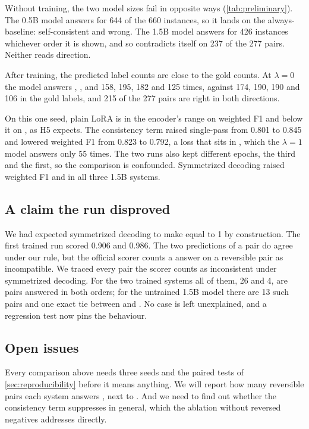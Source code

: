 Without training, the two model sizes fail in opposite ways (\cref{tab:preliminary}). The 0.5B model answers \EQ{} for 644 of the 660 instances, so it lands on the always-\EQ{} baseline: self-consistent and wrong. The 1.5B model answers \FW{} for 426 instances whichever order it is shown, and so contradicts itself on 237 of the 277 pairs. Neither reads direction.

After training, the predicted label counts are close to the gold counts. At $\lambda = 0$ the model answers \EQ{}, \FW{}, \BW{} and \NO{} 158, 195, 182 and 125 times, against 174, 190, 190 and 106 in the gold labels, and 215 of the 277 pairs are right in both directions.

On this one seed, plain LoRA is in the encoder's range on weighted F1 and below it on \SoftCons{}, as H5 expects. The consistency term raised single-pass \SoftCons{} from 0.801 to 0.845 and lowered weighted F1 from 0.823 to 0.792, a loss that sits in \NO{}, which the $\lambda = 1$ model answers only 55 times. The two runs also kept different epochs, the third and the first, so the comparison is confounded. Symmetrized decoding raised weighted F1 and \HardCons{} in all three 1.5B systems.

\subsection{A claim the run disproved}

We had expected symmetrized decoding to make \SoftCons{} equal to 1 by construction. The first trained run scored 0.906 and 0.986. The two predictions of a pair do agree under our rule, but the official scorer counts a \NO{} answer on a reversible pair as incompatible. We traced every pair the scorer counts as inconsistent under symmetrized decoding. For the two trained systems all of them, 26 and 4, are pairs answered \NO{} in both orders; for the untrained 1.5B model there are 13 such pairs and one exact tie between \FW{} and \BW{}. No case is left unexplained, and a regression test now pins the behaviour.

\subsection{Open issues}

Every comparison above needs three seeds and the paired tests of \cref{sec:reproducibility} before it means anything. We will report how many reversible pairs each system answers \NO{}, next to \SoftCons{}. And we need to find out whether the consistency term suppresses \NO{} in general, which the ablation without reversed negatives addresses directly.
